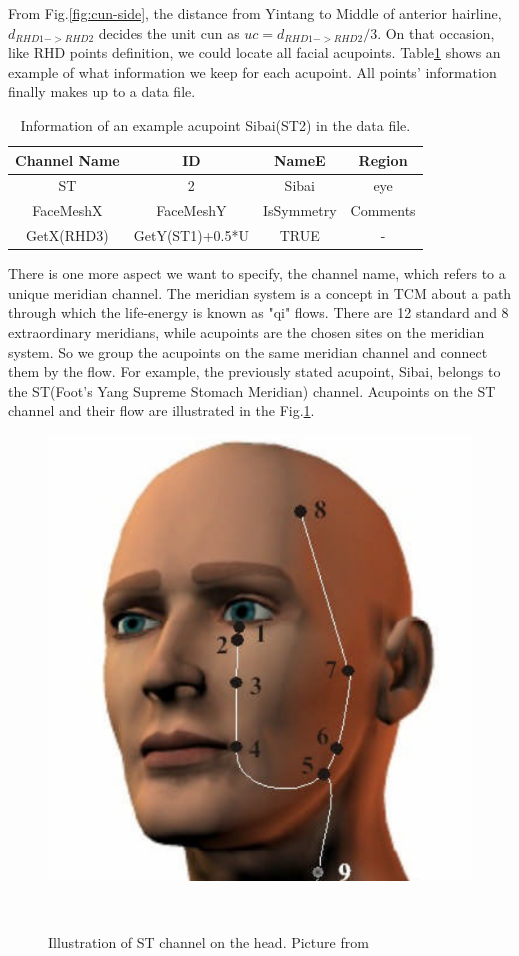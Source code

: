 From Fig.\ref{fig:cun-side}, the distance from Yintang to Middle of anterior hairline, $d_{RHD1->RHD2}$ decides the unit cun as $uc=d_{RHD1->RHD2}/3$. On that occasion, like RHD points definition, we could locate all facial acupoints. Table\ref{tab:acu-info} shows an example of what information we keep for each acupoint. All points’ information finally makes up to a data file.

\begin{table}
\begin{center}
\begin{tabular}{c|c|c|c}
\hline
Channel Name & ID & NameE & Region \\
\hline
ST& 2& Sibai & eye\\
\hline
\hline
FaceMeshX & FaceMeshY & IsSymmetry & Comments \\
\hline
GetX(RHD3)& GetY(ST1)+0.5*U & TRUE & - \\
\hline
\end{tabular}
\end{center}
\caption {Information of an example acupoint Sibai(ST2) in the data file.} 
\label{tab:acu-info} 
\end{table}
There is one more aspect we want to specify, the channel name, which refers to a unique meridian channel. The meridian system is a concept in TCM about a path through which the life-energy is known as "qi" flows. There are 12 standard and 8 extraordinary meridians, while acupoints are the chosen sites on the meridian system. So we group the acupoints on the same meridian channel and connect them by the flow. For example, the previously stated acupoint, Sibai, belongs to the ST(Foot's Yang Supreme Stomach Meridian) channel. Acupoints on the ST channel and their flow are illustrated in the Fig.\ref{fig:st_channel}.
\begin{figure}
\centering
  \includegraphics[width=0.8\columnwidth]{figures/st.png}
  \caption{Illustration of ST channel on the head. Picture from \protect\cite{stchannel} }~\label{fig:st_channel}
\end{figure}

